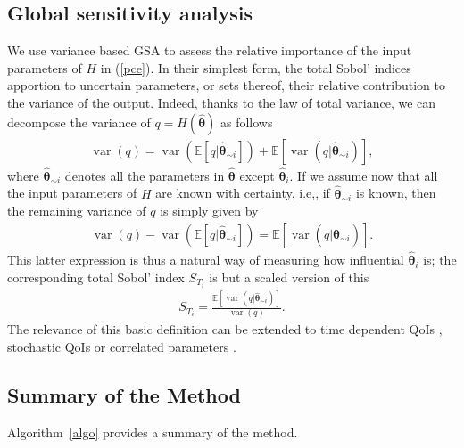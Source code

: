 \subsection{Global sensitivity analysis} 
\label{sec:gsa}
We use variance based GSA to assess the relative importance of the input parameters of $H$ in (\ref{pce}). In their simplest form,  the total Sobol' indices \cite{saltellitotalindex} apportion to uncertain parameters, or sets thereof, their relative contribution to the variance of the output. Indeed, thanks to the law of total variance, we can decompose the variance of $q = H(\hat{\boldsymbol{\theta}})$ as follows
\begin{eqnarray}
\operatorname{var}(q) = \operatorname{var}(\mathbb E[q|\hat{\boldsymbol{\theta}}_{\sim i}]) + \mathbb E[\operatorname{var}(q|\hat{\boldsymbol{\theta}}_{\sim i})], \label{ltv}
\end{eqnarray}
where $\hat{\boldsymbol{\theta}}_{\sim i}$ denotes all the parameters in $\hat{\boldsymbol{\theta}}$ except $\hat{\boldsymbol{\theta}}_i$. If we assume now that all the input parameters of $H$ are known with certainty, i.e,, if $\hat{\boldsymbol{\theta}}_{\sim i}$ is known, then the remaining variance of $q$ is simply given by 
\begin{eqnarray*}
\operatorname{var}(q) - \operatorname{var}(\mathbb E[q|\hat{\boldsymbol{\theta}}_{\sim i}]) = \mathbb E[\operatorname{var}(q|\hat{\boldsymbol{\theta}}_{\sim i})]. 
\end{eqnarray*}
This latter expression is thus a natural way of measuring how influential $\hat{\boldsymbol{\theta}}_i$ is; the corresponding total Sobol' index $S_{T_i}$ is but a scaled version of this
\begin{eqnarray}
S_{T_i} = \frac{\mathbb E[\operatorname{var}(q|\hat{\boldsymbol{\theta}}_{\sim i})]}{\operatorname{var}(q) }. \label{sobol}
\end{eqnarray}
The relevance of this basic definition can be extended to time dependent QoIs \cite{timegsa}, stochastic QoIs \cite{stogsa} or correlated parameters \cite{corvar}.


\subsection{Summary of the Method}
\label{sec:summary}
Algorithm~\ref{algo} provides a summary of the method. 

